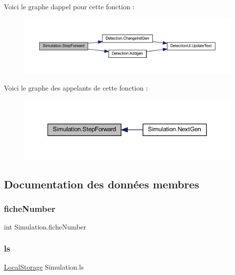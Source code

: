 Voici le graphe d\textquotesingle{}appel pour cette fonction \+:
\nopagebreak
\begin{figure}[H]
\begin{center}
\leavevmode
\includegraphics[width=350pt]{class_simulation_a1ba6581d305c2d60d174e0cffd917719_cgraph}
\end{center}
\end{figure}
Voici le graphe des appelants de cette fonction \+:
\nopagebreak
\begin{figure}[H]
\begin{center}
\leavevmode
\includegraphics[width=340pt]{class_simulation_a1ba6581d305c2d60d174e0cffd917719_icgraph}
\end{center}
\end{figure}


\subsection{Documentation des données membres}
\mbox{\label{class_simulation_a4fd8bb7eb15c0462da5f0615d293e404}} 
\subsubsection{\texorpdfstring{fiche\+Number}{ficheNumber}}
{\footnotesize\ttfamily int Simulation.\+fiche\+Number}

\mbox{\label{class_simulation_a7009e8c0768bac6a8056db7b9614a040}} 
\subsubsection{\texorpdfstring{ls}{ls}}
{\footnotesize\ttfamily \mbox{\hyperlink{class_local_storage}{Local\+Storage}} Simulation.\+ls}

